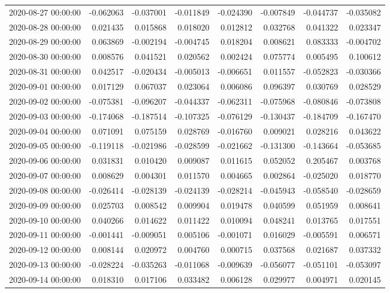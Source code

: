 \begin{tabular}{lrrrrrrr}
2020-08-27 00:00:00 & -0.062063 & -0.037001 & -0.011849 & -0.024390 & -0.007849 & -0.044737 & -0.035082 \\
2020-08-28 00:00:00 & 0.021435 & 0.015868 & 0.018020 & 0.012812 & 0.032768 & 0.041322 & 0.023347 \\
2020-08-29 00:00:00 & 0.063869 & -0.002194 & -0.004745 & 0.018204 & 0.008621 & 0.083333 & -0.004702 \\
2020-08-30 00:00:00 & 0.008576 & 0.041521 & 0.020562 & 0.002424 & 0.075774 & 0.005495 & 0.100612 \\
2020-08-31 00:00:00 & 0.042517 & -0.020434 & -0.005013 & -0.006651 & 0.011557 & -0.052823 & -0.030366 \\
2020-09-01 00:00:00 & 0.017129 & 0.067037 & 0.023064 & 0.006086 & 0.096397 & 0.030769 & 0.028529 \\
2020-09-02 00:00:00 & -0.075381 & -0.096207 & -0.044337 & -0.062311 & -0.075968 & -0.080846 & -0.073808 \\
2020-09-03 00:00:00 & -0.174068 & -0.187514 & -0.107325 & -0.076129 & -0.130437 & -0.184709 & -0.167470 \\
2020-09-04 00:00:00 & 0.071091 & 0.075159 & 0.028769 & -0.016760 & 0.009021 & 0.028216 & 0.043622 \\
2020-09-05 00:00:00 & -0.119118 & -0.021986 & -0.028599 & -0.021662 & -0.131300 & -0.143664 & -0.053685 \\
2020-09-06 00:00:00 & 0.031831 & 0.010420 & 0.009087 & 0.011615 & 0.052052 & 0.205467 & 0.003768 \\
2020-09-07 00:00:00 & 0.008629 & 0.004301 & 0.011570 & 0.004665 & 0.002864 & -0.025020 & 0.018770 \\
2020-09-08 00:00:00 & -0.026414 & -0.028139 & -0.024139 & -0.028214 & -0.045943 & -0.058540 & -0.028659 \\
2020-09-09 00:00:00 & 0.025703 & 0.008542 & 0.009904 & 0.019478 & 0.040599 & 0.051959 & 0.008641 \\
2020-09-10 00:00:00 & 0.040266 & 0.014622 & 0.011422 & 0.010094 & 0.048241 & 0.013765 & 0.017551 \\
2020-09-11 00:00:00 & -0.001441 & -0.009051 & 0.005106 & -0.001071 & 0.016029 & -0.005591 & 0.006571 \\
2020-09-12 00:00:00 & 0.008144 & 0.020972 & 0.004760 & 0.000715 & 0.037568 & 0.021687 & 0.037332 \\
2020-09-13 00:00:00 & -0.028224 & -0.035263 & -0.011068 & -0.009639 & -0.056077 & -0.051101 & -0.053097 \\
2020-09-14 00:00:00 & 0.018310 & 0.017106 & 0.033482 & 0.006128 & 0.029977 & 0.004971 & 0.020145 \\

\end{tabular}

